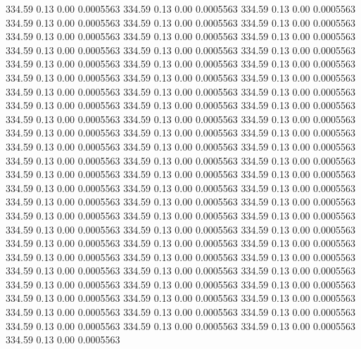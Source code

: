  334.59    0.13    0.00   0.0005563
 334.59    0.13    0.00   0.0005563
 334.59    0.13    0.00   0.0005563
 334.59    0.13    0.00   0.0005563
 334.59    0.13    0.00   0.0005563
 334.59    0.13    0.00   0.0005563
 334.59    0.13    0.00   0.0005563
 334.59    0.13    0.00   0.0005563
 334.59    0.13    0.00   0.0005563
 334.59    0.13    0.00   0.0005563
 334.59    0.13    0.00   0.0005563
 334.59    0.13    0.00   0.0005563
 334.59    0.13    0.00   0.0005563
 334.59    0.13    0.00   0.0005563
 334.59    0.13    0.00   0.0005563
 334.59    0.13    0.00   0.0005563
 334.59    0.13    0.00   0.0005563
 334.59    0.13    0.00   0.0005563
 334.59    0.13    0.00   0.0005563
 334.59    0.13    0.00   0.0005563
 334.59    0.13    0.00   0.0005563
 334.59    0.13    0.00   0.0005563
 334.59    0.13    0.00   0.0005563
 334.59    0.13    0.00   0.0005563
 334.59    0.13    0.00   0.0005563
 334.59    0.13    0.00   0.0005563
 334.59    0.13    0.00   0.0005563
 334.59    0.13    0.00   0.0005563
 334.59    0.13    0.00   0.0005563
 334.59    0.13    0.00   0.0005563
 334.59    0.13    0.00   0.0005563
 334.59    0.13    0.00   0.0005563
 334.59    0.13    0.00   0.0005563
 334.59    0.13    0.00   0.0005563
 334.59    0.13    0.00   0.0005563
 334.59    0.13    0.00   0.0005563
 334.59    0.13    0.00   0.0005563
 334.59    0.13    0.00   0.0005563
 334.59    0.13    0.00   0.0005563
 334.59    0.13    0.00   0.0005563
 334.59    0.13    0.00   0.0005563
 334.59    0.13    0.00   0.0005563
 334.59    0.13    0.00   0.0005563
 334.59    0.13    0.00   0.0005563
 334.59    0.13    0.00   0.0005563
 334.59    0.13    0.00   0.0005563
 334.59    0.13    0.00   0.0005563
 334.59    0.13    0.00   0.0005563
 334.59    0.13    0.00   0.0005563
 334.59    0.13    0.00   0.0005563
 334.59    0.13    0.00   0.0005563
 334.59    0.13    0.00   0.0005563
 334.59    0.13    0.00   0.0005563
 334.59    0.13    0.00   0.0005563
 334.59    0.13    0.00   0.0005563
 334.59    0.13    0.00   0.0005563
 334.59    0.13    0.00   0.0005563
 334.59    0.13    0.00   0.0005563
 334.59    0.13    0.00   0.0005563
 334.59    0.13    0.00   0.0005563
 334.59    0.13    0.00   0.0005563
 334.59    0.13    0.00   0.0005563
 334.59    0.13    0.00   0.0005563
 334.59    0.13    0.00   0.0005563
 334.59    0.13    0.00   0.0005563
 334.59    0.13    0.00   0.0005563
 334.59    0.13    0.00   0.0005563
 334.59    0.13    0.00   0.0005563
 334.59    0.13    0.00   0.0005563
 334.59    0.13    0.00   0.0005563
 334.59    0.13    0.00   0.0005563
 334.59    0.13    0.00   0.0005563
 334.59    0.13    0.00   0.0005563
